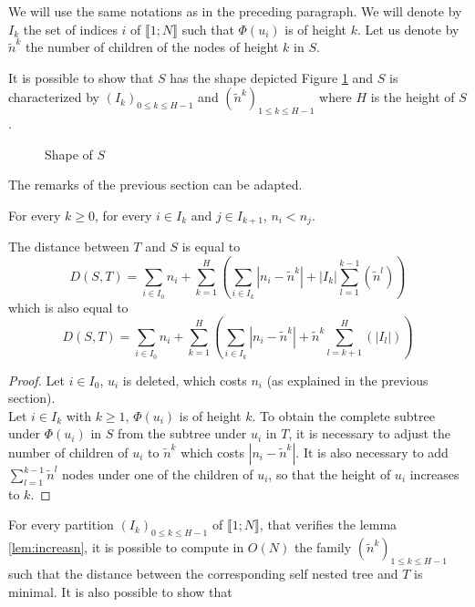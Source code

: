 We will use the same notations as in the preceding paragraph. We will
denote by $I_{k}$ the set of indices $i$ of
$\llbracket 1;N \rrbracket$ such that $\Phi(u_{i})$ is of height
$k$. Let us denote by $\tilde{n}^{k}$ the number of children of the
nodes of height $k$ in $S$.

It is possible to show that $S$ has the shape depicted
Figure \ref{fig:shape_NST_2}%
and $S$ is characterized by $(I_{k})_{0 \leqslant k \leqslant H-1}$
and $(\tilde{n}^{k})_{1 \leqslant k \leqslant H-1}$ where $H$ is the
height of $S$.
\begin{figure}
  \centering
  
  \caption{Shape of $S$}
  \label{fig:shape_NST_2}
\end{figure}
The remarks of the previous section can be adapted.

\begin{lem}
  \label{lem:increasn}
  For every $k \geqslant 0$, for every $i \in I_{k}$ and $j \in
  I_{k+1}$, $n_{i} < n_{j}$.
\end{lem}

\begin{lem}
 The distance between $T$ and $S$ is equal to 
 $$ D(S,T) = \sum_{i \in I_{0}} n_{i} + \sum_{k = 1}^{H} \left(
   \sum_{i \in I_{k}} |n_{i} - \tilde{n}^{k}| + |I_{k}|\sum_{l =
     1}^{k-1}(\tilde{n}^{l}) \right)$$ 
 which is also equal to 
 $$ D(S,T) = \sum_{i \in I_{0}} n_{i} + \sum_{k = 1}^{H} \left(
   \sum_{i \in I_{k}} |n_{i} - \tilde{n}^{k}| + \tilde{n}^{k}\sum_{l =
     k+1}^{H}(|I_{l}|) \right)$$
 \begin{proof}
   Let $i \in I_{0}$, $u_{i}$ is deleted, which costs $n_{i}$ (as
   explained in the previous section).\\
   Let $i \in I_{k}$ with $k \geqslant 1$, $\Phi(u_{i})$ is of height
   $k$. To obtain the complete subtree under $\Phi(u_{i})$ in $S$ from
   the subtree under $u_{i}$ in $T$, it is necessary to adjust the
   number of children of $u_{i}$ to $\tilde{n}^{k}$ which costs
   $\left| n_{i} - \tilde{n}^{k} \right|$. It is also necessary to add
   $\sum_{l = 1}^{k-1}\tilde{n}^{l}$ nodes under one of the children
   of $u_{i}$, so that the height of $u_{i}$ increases to $k$.
   \end{proof}
\end{lem}

For every partition $(I_{k})_{0 \leqslant k \leqslant H-1}$ of
$\llbracket 1;N \rrbracket$, that verifies the lemma
\ref{lem:increasn}, it is possible to compute in $O(N)$ the family
$(\tilde{n}^{k})_{1 \leqslant k \leqslant H-1}$ such that the distance
between the corresponding self nested tree and $T$ is minimal. It is
also possible to show that

